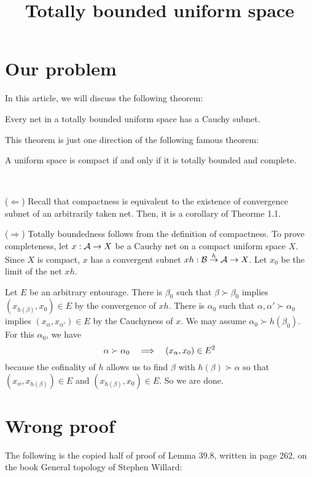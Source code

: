 \documentclass{../exp}
\title{Totally bounded uniform space}
\begin{document}
\maketitle
\tableofcontents

\section{Our problem}
In this article, we will discuss the following theorem:
\begin{thm}
Every net in a totally bounded uniform space has a Cauchy subnet.
\end{thm}
This theorem is just one direction of the following famous theorem:
\begin{thm}
A uniform space is compact if and only if it is totally bounded and complete.
\end{thm}
\begin{pf}\,

($\Leftarrow$)
Recall that compactness is equivalent to the existence of convergence subnet of an arbitrarily taken net.
Then, it is a corollary of Theorme 1.1.

($\Rightarrow$)
Totally boundedness follows from the definition of compactness.
To prove completeness, let $x:\cA\to X$ be a Cauchy net on a compact uniform space $X$.
Since $X$ is compact, $x$ has a convergent subnet $xh:\cB\to{h}\cA\to X$.
Let $x_0$ be the limit of the net $xh$.

Let $E$ be an arbitrary entourage.
There is $\beta_0$ such that $\beta\succ\beta_0$ implies $(x_{h(\beta)},x_0)\in E$ by the convergence of $xh$.
There is $\alpha_0$ such that $\alpha,\alpha'\succ\alpha_0$ implies $(x_\alpha,x_{\alpha'})\in E$ by the Cauchyness of $x$.
We may assume $\alpha_0\succ h(\beta_0)$.
For this $\alpha_0$, we have
\[\alpha\succ\alpha_0\impl(x_\alpha,x_0)\in E^2\]
because the cofinality of $h$ allows us to find $\beta$ with $h(\beta)\succ\alpha$ so that $(x_\alpha,x_{h(\beta)})\in E$ and $(x_{h(\beta)},x_0)\in E$.
So we are done.
\end{pf}


\section{Wrong proof}
The following is the copied half of proof of Lemma 39.8, written in page 262, on the book General topology of Stephen Willard:
\bigskip
\end{document}
